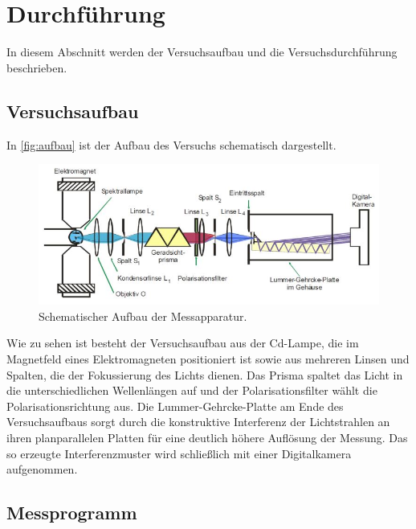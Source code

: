 \section{Durchführung}
\label{sec:Durchführung}

In diesem Abschnitt werden der Versuchsaufbau und die Versuchsdurchführung beschrieben.

\subsection{Versuchsaufbau}

In \autoref{fig:aufbau} ist der Aufbau des Versuchs schematisch dargestellt.
\begin{figure}[H]
    \centering
    \includegraphics[width=\textwidth]{graphics/aufbau.JPG}
    \caption{Schematischer Aufbau der Messapparatur. \cite{v27}}
    \label{fig:aufbau}
\end{figure}

Wie zu sehen ist besteht der Versuchsaufbau aus der Cd-Lampe, die im Magnetfeld eines Elektromagneten positioniert ist sowie aus mehreren Linsen und Spalten, die der Fokussierung des Lichts dienen. Das Prisma spaltet das Licht in die unterschiedlichen Wellenlängen auf und der Polarisationsfilter wählt die Polarisationsrichtung aus. Die Lummer-Gehrcke-Platte am Ende des Versuchsaufbaus sorgt durch die konstruktive Interferenz der Lichtstrahlen an ihren planparallelen Platten für eine deutlich höhere Auflösung der Messung. Das so erzeugte Interferenzmuster wird schließlich mit einer Digitalkamera aufgenommen.

\subsection{Messprogramm}

